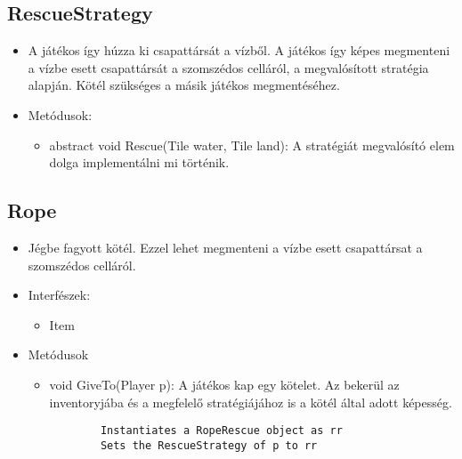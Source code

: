 \subsection{RescueStrategy}
\begin{itemize}
	\item A játékos így húzza ki csapattársát a vízből. A játékos így képes megmenteni a vízbe esett csapattársát a szomszédos celláról, a megvalósított stratégia alapján. Kötél szükséges a másik játékos megmentéséhez.
	\item Metódusok:
	\begin{itemize}
		\item abstract void Rescue(Tile water, Tile land): A stratégiát megvalósító elem dolga implementálni mi történik.
	\end{itemize}
\end{itemize}

\subsection{Rope}
\begin{itemize}
	\item Jégbe fagyott kötél. Ezzel lehet megmenteni a vízbe esett csapattársat a szomszédos celláról.
	\item Interfészek:
	\begin{itemize}
		\item Item
	\end{itemize}
	\item Metódusok
	\begin{itemize}
		\item void GiveTo(Player p): A játékos kap egy kötelet. Az bekerül az inventoryjába és a megfelelő stratégiájához is a kötél által adott képesség.
		\begin{lstlisting}
		Instantiates a RopeRescue object as rr
		Sets the RescueStrategy of p to rr
		\end{lstlisting}
	\end{itemize}
\end{itemize}

